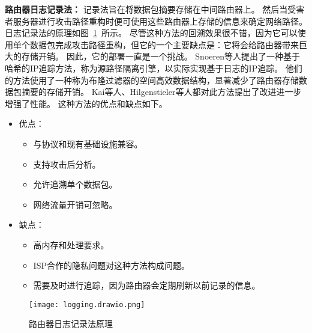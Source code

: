 \textbf{路由器日志记录法：}
记录法旨在将数据包摘要存储在中间路由器上。
然后当受害者服务器进行攻击路径重构时便可使用这些路由器上存储的信息来确定网络路径。
日志记录法的原理如图~\ref{fig:loggging}~所示。
尽管这种方法的回溯效果很不错，因为它可以使用单个数据包完成攻击路径重构，但它的一个主要缺点是：它将会给路由器带来巨大的存储开销。
因此，它的部署一直是一个挑战。
Snoeren等人\cite{Snoeren2001}提出了一种基于哈希的IP追踪方法，称为源路径隔离引擎，以实际实现基于日志的IP追踪。
他们的方法使用了一种称为布隆过滤器的空间高效数据结构，显著减少了路由器存储数据包摘要的存储开销。
Kai等人\cite{Kai2009}、Hilgenstieler等人\cite{Hilgenstieler2010}都对此方法提出了改进进一步增强了性能。
这种方法的优点和缺点如下。
\begin{itemize}
  \item 优点：
  \begin{itemize}
    \item 与协议和现有基础设施兼容。
    \item 支持攻击后分析。
    \item 允许追溯单个数据包。
    \item 网络流量开销可忽略。
  \end{itemize}
  \item 缺点：
    \begin{itemize}
      \item 高内存和处理要求。
      \item ISP合作的隐私问题对这种方法构成问题。
      \item 需要及时进行追踪，因为路由器会定期刷新以前记录的信息。
    \end{itemize}
\end{itemize}

\begin{figure}[htbp]
  \centering
  \texttt{[image: logging.drawio.png]}
  \caption{路由器日志记录法原理}
  \label{fig:loggging}
\end{figure}


